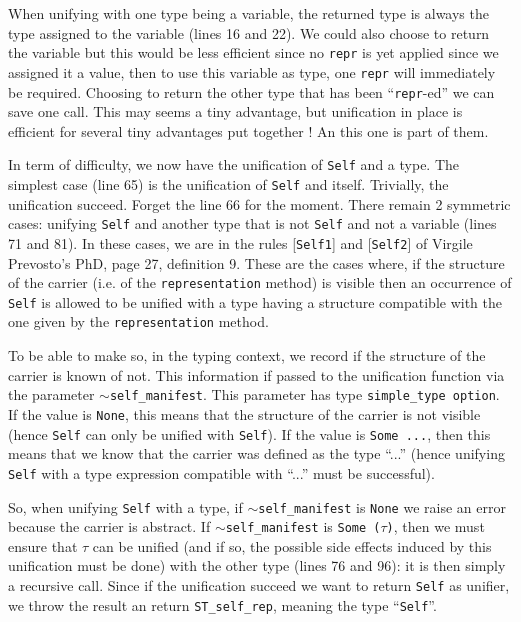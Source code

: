 When unifying with one type being a variable, the returned type is
always the type assigned to the variable (lines 16 and 22). We could
also choose to return the variable but this would be less efficient
since no {\tt repr} is yet applied since we assigned it a value, then
to use this variable as type, one {\tt repr} will immediately be
required. Choosing to return the other type that has been
``{\tt repr}-ed'' we can save one call. This may seems a tiny
advantage, but unification in place is efficient for several tiny
advantages put together ! An this one is part of them.

\medskip
In term of difficulty, we now have the unification of {\tt Self} and a
type. The simplest case (line 65) is the unification of {\tt Self} and
itself. Trivially, the unification succeed. Forget the line 66 for the
moment. There remain 2 symmetric cases: unifying {\tt Self} and another
type that is not {\tt Self} and not a variable (lines 71 and 81).
In these cases, we are in the rules [{\tt Self1}] and [{\tt Self2}] of
Virgile Prevosto's PhD, page 27, definition 9. These are the cases
where, if the structure of the carrier (i.e. of the {\tt representation}
method) is visible then an occurrence of {\tt Self} is allowed to be
unified with a type having a structure compatible with the one given
by the {\tt representation} method.

To be able to make so, in the typing context, we record if the
structure of the carrier is known of not. This information if passed
to the unification function via the parameter
{\tt $\sim$self\_manifest}. This parameter has type
{\tt simple\_type option}. If the value is {\tt None}, this means that
the structure of the carrier is not visible (hence {\tt Self} can only
be unified with {\tt Self}). If the value is {\tt Some ...}, then this
means that we know that the carrier was defined as the type ``...''
(hence unifying {\tt Self} with a type expression compatible with
``...'' must be successful).

So, when unifying {\tt Self} with a type, if {\tt $\sim$self\_manifest}
is {\tt None} we raise an error because the carrier is abstract. If 
{\tt  $\sim$self\_manifest} is {\tt Some (}$\tau${\tt )}, then we must
ensure that $\tau$ can be unified (and if so, the possible side
effects induced by this unification must be done) with the other type
(lines 76 and 96): it is then simply a recursive call. Since if the
unification succeed we want to return {\tt Self} as unifier, we throw
the result an return {\tt ST\_self\_rep}, meaning the type
``{\tt Self}''.

